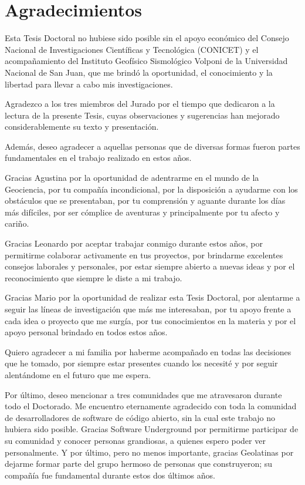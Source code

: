 \chapter*{Agradecimientos}

Esta Tesis Doctoral no hubiese sido posible sin el apoyo económico del Consejo
Nacional de Investigaciones Científicas y Tecnológica (CONICET) y el
acompañamiento del Instituto Geofísico Sismológico Volponi de la Universidad
Nacional de San Juan, que me brindó la oportunidad, el conocimiento y la
libertad para llevar a cabo mis investigaciones.

Agradezco a los tres miembros del Jurado por el tiempo que dedicaron a la
lectura de la presente Tesis, cuyas observaciones y sugerencias han mejorado
considerablemente su texto y presentación.

Además, deseo agradecer a aquellas personas que de diversas formas fueron
partes fundamentales en el trabajo realizado en estos años.

Gracias Agustina por la oportunidad de adentrarme en el mundo de la Geociencia,
por tu compañía incondicional, por la disposición a ayudarme con los obstáculos
que se presentaban, por tu comprensión y aguante durante los días más
difíciles, por ser cómplice de aventuras y principalmente por tu afecto
y cariño.

Gracias Leonardo por aceptar trabajar conmigo durante estos años, por
permitirme colaborar activamente en tus proyectos, por brindarme excelentes
consejos laborales y personales, por estar siempre abierto a nuevas ideas y por
el reconocimiento que siempre le diste a mi trabajo.

Gracias Mario por la oportunidad de realizar esta Tesis Doctoral, por alentarme
a seguir las líneas de investigación que más me interesaban, por tu apoyo
frente a cada idea o proyecto que me surgía, por tus conocimientos en la
materia y por el apoyo personal brindado en todos estos años.

Quiero agradecer a mi familia por haberme acompañado en todas las decisiones
que he tomado, por siempre estar presentes cuando los necesité y por seguir
alentándome en el futuro que me espera.

Por último, deseo mencionar a tres comunidades que me atravesaron durante todo
el Doctorado.
Me encuentro eternamente agradecido con toda la comunidad de desarrolladores de
software de código abierto, sin la cual este trabajo no hubiera sido posible.
Gracias Software Underground por permitirme participar de su comunidad
y conocer personas grandiosas, a quienes espero poder ver personalmente.
Y por último, pero no menos importante, gracias Geolatinas por dejarme formar
parte del grupo hermoso de personas que construyeron; su compañía fue
fundamental durante estos dos últimos años.
